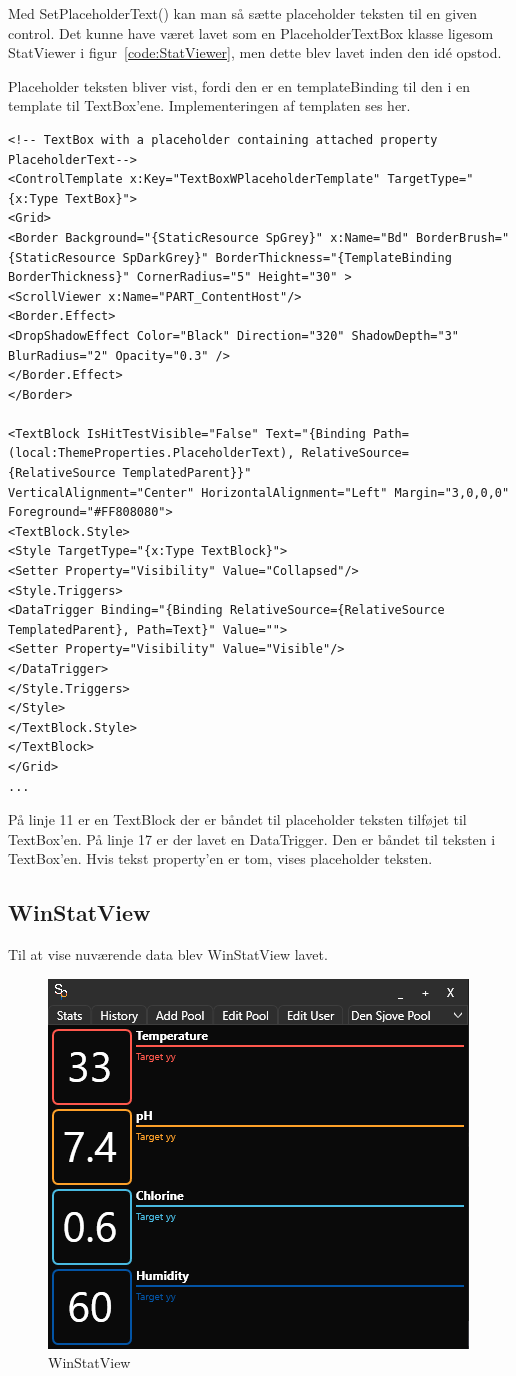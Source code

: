Med SetPlaceholderText() kan man så sætte placeholder teksten til en given control.
Det kunne have været lavet som en PlaceholderTextBox klasse ligesom StatViewer i figur~\ref{code:StatViewer}, men dette blev lavet inden den idé opstod.

Placeholder teksten bliver vist, fordi den er en templateBinding til den i en template til TextBox'ene. Implementeringen af templaten ses her.
\begin{lstlisting}[caption=TextBoxWPlaceholderTemplate, label=code:TextBoxWPlaceholderTemplate]
<!-- TextBox with a placeholder containing attached property PlaceholderText-->
<ControlTemplate x:Key="TextBoxWPlaceholderTemplate" TargetType="{x:Type TextBox}">
<Grid>
<Border Background="{StaticResource SpGrey}" x:Name="Bd" BorderBrush="{StaticResource SpDarkGrey}" BorderThickness="{TemplateBinding BorderThickness}" CornerRadius="5" Height="30" >
<ScrollViewer x:Name="PART_ContentHost"/>
<Border.Effect>
<DropShadowEffect Color="Black" Direction="320" ShadowDepth="3" BlurRadius="2" Opacity="0.3" />
</Border.Effect>
</Border>

<TextBlock IsHitTestVisible="False" Text="{Binding Path=(local:ThemeProperties.PlaceholderText), RelativeSource={RelativeSource TemplatedParent}}" 
VerticalAlignment="Center" HorizontalAlignment="Left" Margin="3,0,0,0" Foreground="#FF808080">
<TextBlock.Style>
<Style TargetType="{x:Type TextBlock}">
<Setter Property="Visibility" Value="Collapsed"/>
<Style.Triggers>
<DataTrigger Binding="{Binding RelativeSource={RelativeSource TemplatedParent}, Path=Text}" Value="">
<Setter Property="Visibility" Value="Visible"/>
</DataTrigger>
</Style.Triggers>
</Style>
</TextBlock.Style>
</TextBlock>
</Grid>
...
\end{lstlisting}
På linje 11 er en TextBlock der er båndet til placeholder teksten tilføjet til TextBox'en. 
På linje 17 er der lavet en DataTrigger. Den er båndet til teksten i TextBox'en. Hvis tekst property'en er tom, vises placeholder teksten.
\subsection{WinStatView}
Til at vise nuværende data blev WinStatView lavet.
\begin{figure}[h]
	\centering
	\includegraphics[width=0.5\linewidth]{figs/implementering/winstatview}
	\caption{WinStatView}
	\label{fig:winstatview}
\end{figure}

